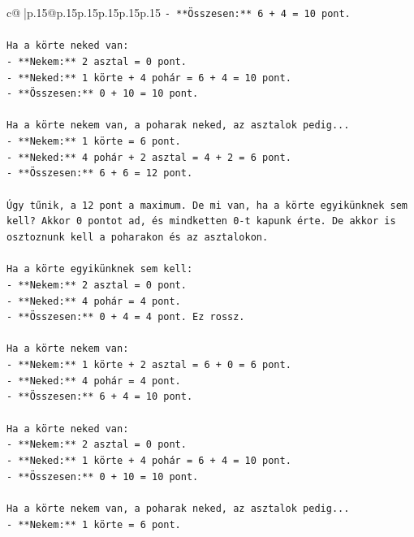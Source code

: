 \documentclass{article}
\begin{document}
{\begin{supertabular}{c@{$\;$}|p{.15\linewidth}@{}p{.15\linewidth}p{.15\linewidth}p{.15\linewidth}p{.15\linewidth}p{.15\linewidth}}
{{{\texttt{{-} **Összesen:** 6 + 4 = 10 pont.} \\
\\ 
\texttt{Ha a körte neked van:} \\
\texttt{{-} **Nekem:** 2 asztal = 0 pont.} \\
\texttt{{-} **Neked:** 1 körte + 4 pohár = 6 + 4 = 10 pont.} \\
\texttt{{-} **Összesen:** 0 + 10 = 10 pont.} \\
\\ 
\texttt{Ha a körte nekem van, a poharak neked, az asztalok pedig...} \\
\texttt{{-} **Nekem:** 1 körte = 6 pont.} \\
\texttt{{-} **Neked:** 4 pohár + 2 asztal = 4 + 2 = 6 pont.} \\
\texttt{{-} **Összesen:** 6 + 6 = 12 pont.} \\
\\ 
\texttt{Úgy tűnik, a 12 pont a maximum. De mi van, ha a körte egyikünknek sem kell? Akkor 0 pontot ad, és mindketten 0{-}t kapunk érte. De akkor is osztoznunk kell a poharakon és az asztalokon.} \\
\\ 
\texttt{Ha a körte egyikünknek sem kell:} \\
\texttt{{-} **Nekem:** 2 asztal = 0 pont.} \\
\texttt{{-} **Neked:** 4 pohár = 4 pont.} \\
\texttt{{-} **Összesen:** 0 + 4 = 4 pont. Ez rossz.} \\
\\ 
\texttt{Ha a körte nekem van:} \\
\texttt{{-} **Nekem:** 1 körte + 2 asztal = 6 + 0 = 6 pont.} \\
\texttt{{-} **Neked:** 4 pohár = 4 pont.} \\
\texttt{{-} **Összesen:** 6 + 4 = 10 pont.} \\
\\ 
\texttt{Ha a körte neked van:} \\
\texttt{{-} **Nekem:** 2 asztal = 0 pont.} \\
\texttt{{-} **Neked:** 1 körte + 4 pohár = 6 + 4 = 10 pont.} \\
\texttt{{-} **Összesen:** 0 + 10 = 10 pont.} \\
\\ 
\texttt{Ha a körte nekem van, a poharak neked, az asztalok pedig...} \\
\texttt{{-} **Nekem:** 1 körte = 6 pont.} \\
}}}
\end{supertabular}}
\end{document}
